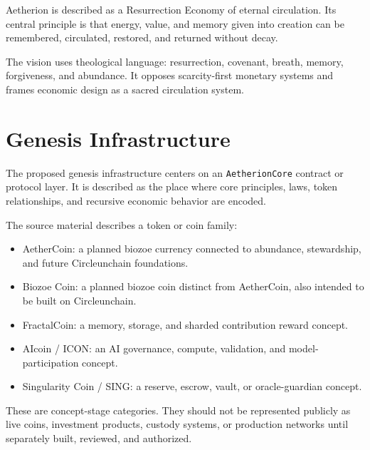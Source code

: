 ﻿\documentclass[12pt]{article}
\begin{document}
Aetherion is described as a Resurrection Economy of eternal circulation. Its central principle is that energy, value, and memory given into creation can be remembered, circulated, restored, and returned without decay.

The vision uses theological language: resurrection, covenant, breath, memory, forgiveness, and abundance. It opposes scarcity-first monetary systems and frames economic design as a sacred circulation system.

\section{Genesis Infrastructure}


The proposed genesis infrastructure centers on an \texttt{AetherionCore} contract or protocol layer. It is described as the place where core principles, laws, token relationships, and recursive economic behavior are encoded.

The source material describes a token or coin family:

\begin{itemize}
  \item AetherCoin: a planned biozoe currency connected to abundance, stewardship, and future Circleunchain foundations.
\end{itemize}
\begin{itemize}
  \item Biozoe Coin: a planned biozoe coin distinct from AetherCoin, also intended to be built on Circleunchain.
\end{itemize}
\begin{itemize}
  \item FractalCoin: a memory, storage, and sharded contribution reward concept.
\end{itemize}
\begin{itemize}
  \item AIcoin / ICON: an AI governance, compute, validation, and model-participation concept.
\end{itemize}
\begin{itemize}
  \item Singularity Coin / SING: a reserve, escrow, vault, or oracle-guardian concept.
\end{itemize}

These are concept-stage categories. They should not be represented publicly as live coins, investment products, custody systems, or production networks until separately built, reviewed, and authorized.
\end{document}
